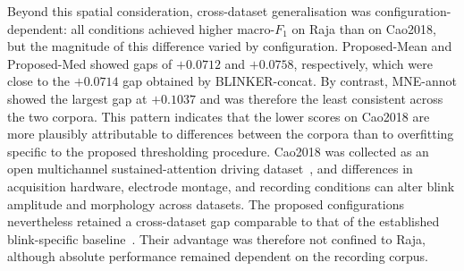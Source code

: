Beyond this spatial consideration, cross-dataset generalisation was configuration-dependent: all conditions achieved higher macro-$F_1$ on Raja than on Cao2018, but the magnitude of this difference varied by configuration. Proposed-Mean and Proposed-Med showed gaps of $+0.0712$ and $+0.0758$, respectively, which were close to the $+0.0714$ gap obtained by BLINKER-concat. By contrast, MNE-annot showed the largest gap at $+0.1037$ and was therefore the least consistent across the two corpora. This pattern indicates that the lower scores on Cao2018 are more plausibly attributable to differences between the corpora than to overfitting specific to the proposed thresholding procedure. Cao2018 was collected as an open multichannel sustained-attention driving dataset~\citep{cao2019multichannel}, and differences in acquisition hardware, electrode montage, and recording conditions can alter blink amplitude and morphology across datasets. The proposed configurations nevertheless retained a cross-dataset gap comparable to that of the established blink-specific baseline~\citep{kleifges2017blinker}. Their advantage was therefore not confined to Raja, although absolute performance remained dependent on the recording corpus.
